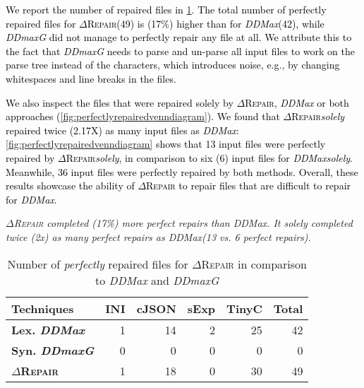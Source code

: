 \documentclass[acmsmall,screen,review,anonymous]{acmart}
\newenvironment{result}{\begin{framed}\centering\it}{\end{framed}}
\newcommand{\revise}[1]{\textcolor{black}{#1}}
\newcommand{\approach}{\textsc{$\Delta$Repair}\xspace}
\newcommand{\ddmax}{\textit{DDMax}\xspace}
\newcommand{\ddmaxg}{\textit{DDmaxG}\xspace}
\begin{document}
\revise{We report the number of repaired files in \cref{tab:perfectrepairs}.
The total number of perfectly repaired files for \approach (49) is (17\%) higher than for \ddmax (42), while \ddmaxg did not manage to perfectly repair any file at all. We attribute this 
to the fact that \ddmaxg needs to parse and un-parse all input files to work on the parse tree instead of the characters, which introduces noise, e.g.,  by changing whitespaces and line breaks in the files.
}

\revise{
We also inspect the files that were repaired solely by \approach, \ddmax 
or both 
approaches (\cref{fig:perfectlyrepairedvenndiagram}).  We found that 
\approach \textit{solely} repaired 
twice (2.17X) as many input files
as 
\ddmax: 
\autoref{fig:perfectlyrepairedvenndiagram} shows that 
13 input files were perfectly repaired by \approach  \textit{solely},  in comparison to six (6) input files for \ddmax  \textit{solely}. 
Meanwhile,  36 input files were perfectly repaired by both methods. 
Overall,  these results showcase the ability of \approach to repair files that are difficult to repair for \ddmax.
}

\begin{result}
\approach completed (17\%) more perfect repairs than \ddmax. It solely completed twice (2x) as many perfect repairs 
as \ddmax (13 vs.  6 perfect repairs). 
\end{result}

\begin{table}[!tbp]\centering
\caption{Number of \textit{perfectly} repaired files for \approach in comparison to \ddmax and \ddmaxg
}
\begin{tabular}{|l |  r  r  r  r | r |}
\hline
\textbf{Techniques}&  \textbf{INI}&\textbf{cJSON} &\textbf{sExp}&\textbf{TinyC}&\textbf{Total}  \\
\hline
\textbf{Lex. \ddmax}  & 1 & 14 & 2 & 25 & 42 \\
\textbf{Syn. \ddmaxg} & 0 & 0  & 0 & 0  & 0  \\
\hline
\textbf{\approach} &  1 & 18  & 0 & 30 & 49  \\
\hline
\end{tabular}
\label{tab:perfectrepairs}
\end{table}
\end{document}
